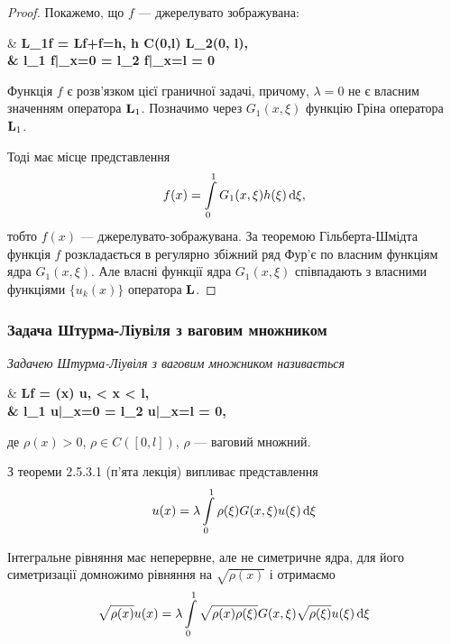 \begin{proof}
	Покажемо, що $f$ --- джерелувато зображувана:
	\begin{system}
		& \bf{L}_1f = \bf{L}f+f=h, \quad h \in C(0,l) \cap L_2(0, l), \\
		& l_1 f|_{x=0} = l_2 f|_{x=l} = 0
	\end{system}

	Функція $f$ є розв'язком цієї граничної задачі, причому, $\lambda = 0$ не є власним значенням оператора $\bf{L}_1$. Позначимо через $G_1(x, \xi)$ функцію Гріна оператора $\bf{L}_1$. \medskip

	Тоді має місце представлення
	\begin{equation}
		f(x) = \Int_0^1 G_1(x, \xi) h(\xi) \diff \xi,
	\end{equation}
	тобто $f(x)$ --- джерелувато-зображувана. За теоремою Гільберта-Шмідта функція $f$ розкладається в регулярно збіжний ряд Фур'є по власним функціям ядра $G_1(x, \xi)$. Але власні функції ядра $G_1(x, \xi)$ співпадають з власними функціями $\{u_k(x)\}$ оператора $\bf{L}$.
\end{proof}

\subsubsection{Задача Штурма-Ліувіля з ваговим множником}

\begin{definition}
	\it{Задачею Штурма-Ліувіля з ваговим множником} називається
	\begin{system}
		& \bf{L}f = \lambda \rho(x) u,  < x < l, \\
		& l_1 u|_{x=0} = l_2 u|_{x=l} = 0,
	\end{system}
	де $\rho(x) > 0$, $\rho \in C([0, l])$, $\rho$ --- ваговий множний.
\end{definition}

З теореми 2.5.3.1 (п'ята лекція) %
випливає представлення
\begin{equation}
	u(x) = \lambda \Int_0^1 \rho(\xi) G(x, \xi) u(\xi) \diff \xi
\end{equation}

Інтегральне рівняння має неперервне, але не симетричне ядра, для його симетризації домножимо рівняння на $\sqrt{\rho(x)}$ і отримаємо
\begin{equation}
	\sqrt{\rho(x)}u(x) = \lambda \Int_0^1 \sqrt{\rho(x)\rho(\xi)} G(x, \xi)\sqrt{ \rho(\xi)}u(\xi) \diff \xi
\end{equation}

